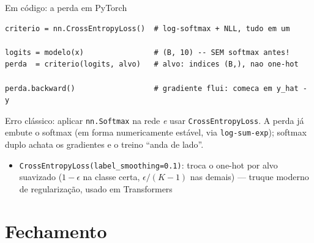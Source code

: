 \documentclass[aspectratio=169, 11pt]{beamer}
\begin{document}
\begin{frame}[fragile]{Em código: a perda em PyTorch}
\begin{lstlisting}
criterio = nn.CrossEntropyLoss()  # log-softmax + NLL, tudo em um

logits = modelo(x)                # (B, 10) -- SEM softmax antes!
perda  = criterio(logits, alvo)   # alvo: indices (B,), nao one-hot

perda.backward()                  # gradiente flui: comeca em y_hat - y
\end{lstlisting}

  \begin{alertabox}
    Erro clássico: aplicar \texttt{nn.Softmax} na rede \emph{e} usar
    \texttt{CrossEntropyLoss}. A perda já embute o softmax (em forma
    numericamente estável, via \texttt{log-sum-exp}); softmax duplo achata os
    gradientes e o treino ``anda de lado''.
  \end{alertabox}

  \begin{itemize}\setlength{\itemsep}{0.2ex}
    \item \texttt{CrossEntropyLoss(label\_smoothing=0.1)}: troca o one-hot por
          alvo suavizado ($1-\epsilon$ na classe certa, $\epsilon/(K{-}1)$ nas demais) —
          truque moderno de regularização, usado em Transformers
  \end{itemize}
\end{frame}

\section{Fechamento}
\end{document}
